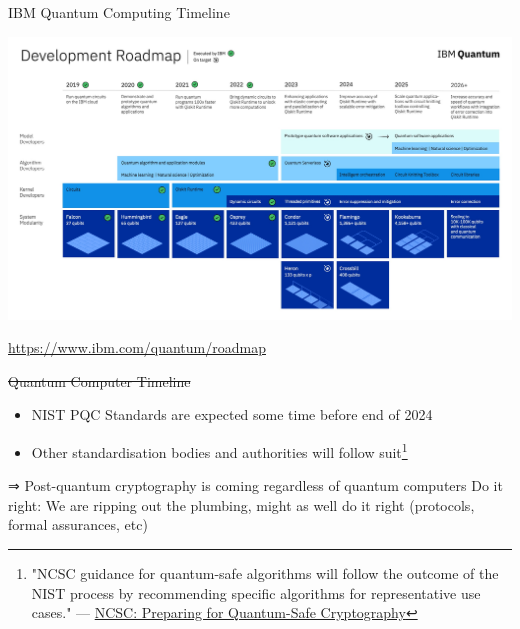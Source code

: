 \documentclass[xcolor=table,10pt,aspectratio=169]{beamer}
\begin{document}
\begin{frame}[label={sec:org7c1db6d}]{IBM Quantum Computing Timeline}
\begin{center}
\includegraphics[keepaspectratio,height=.7\textheight]{./IBM-Quantum-DevRoadmap2022_Light.png}
\end{center}

\tiny \url{https://www.ibm.com/quantum/roadmap}
\end{frame}

\begin{frame}[label={sec:orga6ffd91}]{\sout{Quantum Computer Timeline}}
\begin{itemize}
\item NIST PQC Standards are expected some time before end of 2024
\item Other standardisation bodies and authorities will follow suit\footnote{"NCSC guidance for quantum-safe algorithms will follow the outcome of the NIST process by recommending specific algorithms for representative use cases." --- \href{https://www.ncsc.gov.uk/whitepaper/preparing-for-quantum-safe-cryptography}{NCSC: Preparing for Quantum-Safe Cryptography}}
\end{itemize}

\begin{block}{⇒ Post-quantum cryptography is coming regardless of quantum computers}
Do it right: We are ripping out the plumbing, might as well do it right (protocols, formal assurances, etc)
\end{block}
\end{frame}
\end{document}
